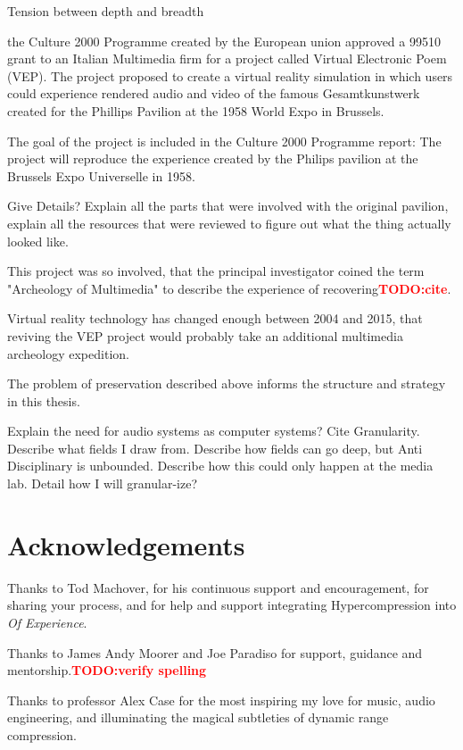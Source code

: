 \documentclass{tufte-book}
\newcommand{\TODO}[1]{\textcolor{red}{\bf TODO:#1}\xspace}
\newcommand{\thesis}{Hypercompression\xspace}
\begin{document}
Tension between depth and breadth

 the Culture 2000 Programme created by the 
European union approved a 99510\EUR{} grant to an Italian Multimedia 
firm for a project called Virtual Electronic Poem (VEP)\cite{eu2004}. 
The project proposed to create a virtual reality simulation in which 
users could experience rendered audio and video of the famous
Gesamtkunstwerk created for the Phillips Pavilion at the 1958 World
Expo in Brussels. 

The goal of the project is included in the Culture 2000 Programme
report: The project will reproduce the experience created by the
Philips pavilion at the Brussels Expo Universelle in 1958.

Give Details? Explain all the parts that were involved with the
original pavilion, explain all the resources that were reviewed to
figure out what the thing actually looked like.

This project was so involved, that the principal investigator coined
the term "Archeology of Multimedia" to describe the experience of
recovering\TODO{cite}.

Virtual reality technology has changed enough between 2004 and 2015,
that reviving the VEP project would probably take an additional
multimedia archeology expedition.

The problem of preservation described above informs the structure and
strategy in this thesis. 

Explain the need for audio systems as computer systems? Cite
Granularity. Describe what fields I draw from. Describe how fields can
go deep, but Anti Disciplinary is unbounded. Describe how this could
only happen at the media lab. Detail how I will granular-ize?


\backmatter

\section*{Acknowledgements}
\label{sec:acknowledgements}

Thanks to Tod Machover, for his continuous support and encouragement,
for sharing your process, and for help and support integrating \thesis
into \textit{Of Experience}. 

Thanks to James Andy Moorer and Joe Paradiso for support, guidance and
mentorship.\TODO{verify spelling}

Thanks to professor Alex Case for the most inspiring my love for
music, audio engineering, and illuminating the magical subtleties of
dynamic range compression.
\end{document}
